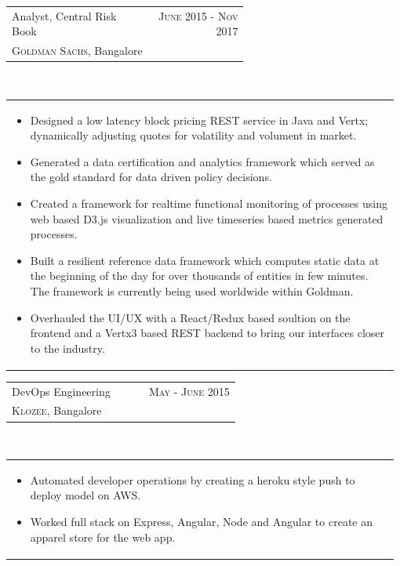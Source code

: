 \documentclass[a4paper]{article} %
\newcommand{\verticalspacing}{-0.25cm}
\newcommand{\bulletspace}{0.7cm}
\newcommand{\projectheadspacing}{6.9cm}
\newcommand{\cproject}[5]{%
    \begin{tabular}{p{0.60\linewidth}r}
        \textcolor{NavyBlue}{\small #2} & \multicolumn{1}{m{ \projectheadspacing{} }}{\raggedleft \small {\textsc{#1}}}\\
        \small {#3} & \small {#4}
    \end{tabular}\\
    \begin{tabular}{p{0.98\linewidth}}
    \vspace{-0.3cm}
        \small{#5}
    \end{tabular}
    \vspace{\verticalspacing{}}
}
\begin{document}
\cproject
      {June 2015 - Nov 2017}
      {Analyst, Central Risk Book}
      {\textsc{Goldman Sachs}, Bangalore}
      {}
      {%
        \begin{itemize}[leftmargin=\bulletspace{}]
          \item Designed a low latency block pricing REST service in Java and Vertx; dynamically adjusting
                quotes for volatility and volument in market.
          \item Generated a data certification and analytics framework which served as the gold standard for
                data driven policy decisions.
          \item Created a framework for realtime functional monitoring of processes using web based
                D3.js visualization and live timeseries based metrics generated processes.
          \item Built a resilient reference data framework which computes static data at the beginning of
                the day for over thousands of entities in few minutes. The framework is currently being used
                worldwide within Goldman.
          \item Overhauled the UI/UX with a React/Redux based soultion on the frontend and a Vertx3 based REST
                backend to bring our interfaces closer to the industry.
        \end{itemize}
      }

\cproject
      {May - June 2015}
      {DevOps Engineering}
      {\textsc{Klozee}, Bangalore}
      {}
      {%
        \begin{itemize}[leftmargin=\bulletspace{}]
          \item Automated developer operations by creating a heroku style push to deploy model on AWS.
          \item Worked full stack on Express, Angular, Node and Angular to create an apparel store for the web app.
        \end{itemize}
      }
\end{document}
